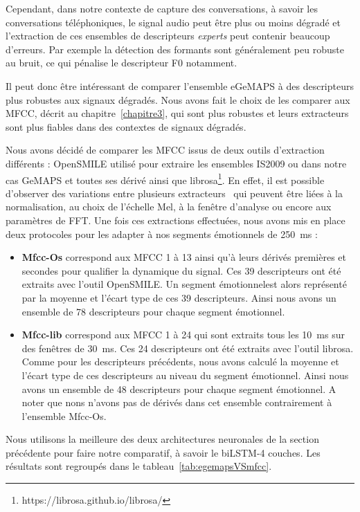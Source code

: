 Cependant, dans notre contexte de capture des conversations, à savoir les conversations téléphoniques, le signal audio peut être plus ou moins dégradé et l'extraction de ces ensembles de descripteurs \textit{experts} peut contenir beaucoup d'erreurs. Par exemple la détection des formants sont généralement peu robuste au bruit, ce qui pénalise le descripteur F0 notamment.%

Il peut donc être intéressant de comparer l'ensemble eGeMAPS à des descripteurs plus robustes aux signaux dégradés. Nous avons fait le choix de les comparer aux MFCC, décrit au chapitre~\ref{chapitre3}, qui sont plus robustes et leurs extracteurs sont plus fiables dans des contextes de signaux dégradés.

Nous avons décidé de comparer les MFCC issus de deux outils d'extraction différents : OpenSMILE utilisé pour extraire les ensembles IS2009 ou dans notre cas GeMAPS et toutes ses dérivé ainsi que librosa\footnote{https://librosa.github.io/librosa/}. En effet, il est possible d'observer des variations entre plusieurs extracteurs~\cite{Ganchev2005} qui peuvent être liées à la normalisation, au choix de l'échelle Mel, à la fenêtre d'analyse ou encore aux paramètres de FFT. Une fois ces extractions effectuées, nous avons mis en place deux protocoles pour les adapter à nos segments émotionnels de 250~ms :
\begin{itemize}
    \item \textbf{Mfcc-Os} correspond aux MFCC 1 à 13 ainsi qu'à leurs dérivés premières et secondes pour qualifier la dynamique du signal. Ces 39 descripteurs ont été extraits avec l’outil OpenSMILE. Un segment émotionnelest alors représenté par la moyenne et l'écart type de ces 39 descripteurs. Ainsi nous avons un ensemble de 78 descripteurs pour chaque segment émotionnel.
    \item \textbf{Mfcc-lib} correspond aux MFCC 1 à 24 qui sont extraits tous les 10~ms sur des fenêtres de 30~ms. Ces 24 descripteurs ont été extraits avec l'outil librosa. Comme pour les descripteurs précédents, nous avons calculé la moyenne et l'écart type de ces descripteurs au niveau du segment émotionnel. Ainsi nous avons un ensemble de 48 descripteurs pour chaque segment émotionnel. A noter que nons n'avons pas de dérivés dans cet ensemble contrairement à l'ensemble Mfcc-Os.
\end{itemize}

Nous utilisons la meilleure des deux architectures neuronales de la section précédente pour faire notre comparatif, à savoir le biLSTM-4 couches. Les résultats sont regroupés dans le tableau~\ref{tab:egemapsVSmfcc}.

